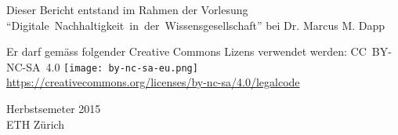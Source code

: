 \begin{titlepage}
\begin{large}
\begin{center}
			Dieser Bericht entstand im Rahmen der Vorlesung \mbox{``Digitale Nachhaltigkeit in der Wissensgesellschaft''} bei Dr{.} Marcus M{.} Dapp \\
			\vspace{2\baselineskip}
	
			Er darf gemäss folgender Creative Commons Lizens verwendet werden: \mbox{CC BY-NC-SA 4.0} \texttt{[image: by-nc-sa-eu.png]}\\ \url{https://creativecommons.org/licenses/by-nc-sa/4.0/legalcode} \\
			\vfill
	
			Herbstsemeter 2015 \\
			\vspace{0.5\baselineskip}
			ETH Zürich
		\end{center}
	\end{large}
\end{titlepage}